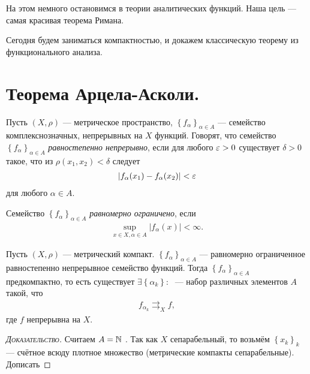 \documentclass[../complex-analysis.tex]{subfiles}
\begin{document}
 На этом немного остановимся в теории аналитических функций. Наша цель --- самая красивая теорема Римана.

 Сегодня будем заниматься компактностью, и докажем классическую теорему из функционального анализа.

 \newpage
 \section{Теорема Арцела-Асколи.}

 \begin{df}
  Пусть $ (X,\rho) $ --- метрическое пространство, $ \left\{f_\alpha\right\}_{\alpha \in A}  $ --- семейство комплекснозначных, непрерывных на $ X $ функций. Говорят, что семейство $ \left\{f_\alpha\right\}_{\alpha\in A}  $ \textit{равностепенно непрерывно}, если для любого $ \varepsilon > 0 $ существует $ \delta > 0 $ такое, что из $ \rho(x_1, x_2) < \delta $ следует
  \begin{align*}
   \left|f_\alpha(x_1) - f_\alpha(x_2) \right| < \varepsilon
  \end{align*} для любого $ \alpha \in A $.
 \end{df}
 \begin{df}
  Семейство $ \left\{f_\alpha\right\}_{\alpha \in A}  $ \textit{равномерно ограничено}, если
  \begin{align*}
   \sup_{x \in X, \alpha \in A} \left| f_\alpha(x) \right| < \infty.
  \end{align*}
 \end{df}

 \begin{thm}
  Пусть $ (X,\rho) $ --- метрический компакт.  $ \left\{f_\alpha\right\}_{\alpha \in A}  $ --- равномерно ограниченное равностепенно непрерывное семейство функций. Тогда $ \left\{f_\alpha\right\}_{\alpha \in A} $ предкомпактно, то есть существует $ \exists \left\{\alpha_k\right\} \colon\;  $ --- набор различных элементов $ A $ такой, что
  \begin{align*}
   f_{\alpha_k} \rightrightarrows_X f,
  \end{align*} где $ f $ непрерывна на $ X $.
 \end{thm}
 \begin{proof}[\normalfont\textsc{Доказательство}]
  Считаем $ A = \mathbb{N} $ . Так как $ X $  сепарабельный, то возьмём $ \left\{x_k\right\}_{k}  $ --- счётное всюду плотное множество (метрические компакты сепарабельные). {\color{red} Дописать}
 \end{proof}
\end{document}
